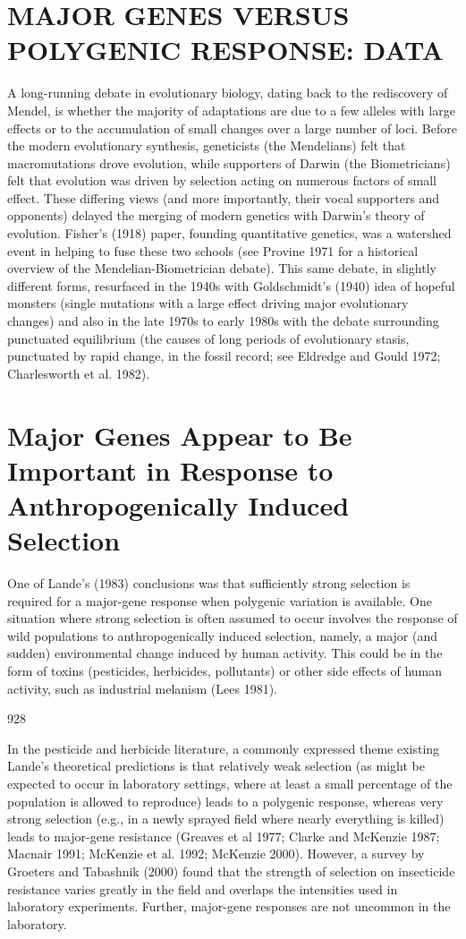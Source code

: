 \documentclass{article}
\begin{document}
\section{MAJOR GENES VERSUS POLYGENIC RESPONSE: DATA}
A long-running debate in evolutionary biology, dating back to the rediscovery of Mendel, is whether the majority of adaptations are due to a few alleles with large effects or to the accumulation of small changes over a large number of loci. Before the modern evolutionary synthesis, geneticists (the Mendelians) felt that macromutations drove evolution, while supporters of Darwin (the Biometricians) felt that evolution was driven by selection acting on numerous factors of small effect. These differing views (and more importantly, their vocal supporters and opponents) delayed the merging of modern genetics with Darwin's theory of evolution. Fisher's (1918) paper, founding quantitative genetics, was a watershed event in helping to fuse these two schools (see Provine 1971 for a historical overview of the Mendelian-Biometrician debate). This same debate, in slightly different forms, resurfaced in the 1940s with Goldschmidt's (1940) idea of hopeful monsters (single mutations with a large effect driving major evolutionary changes) and also in the late 1970s to early 1980s with the debate surrounding punctuated equilibrium (the causes of long periods of evolutionary stasis, punctuated by rapid change, in the fossil record; see Eldredge and Gould 1972; Charlesworth et al. 1982).

\section{Major Genes Appear to Be Important in Response to Anthropogenically Induced Selection}
One of Lande's (1983) conclusions was that sufficiently strong selection is required for a major-gene response when polygenic variation is available. One situation where strong selection is often assumed to occur involves the response of wild populations to anthropogenically induced selection, namely, a major (and sudden) environmental change induced by human activity. This could be in the form of toxins (pesticides, herbicides, pollutants) or other side effects of human activity, such as industrial melanism (Lees 1981).

928

In the pesticide and herbicide literature, a commonly expressed theme existing Lande's theoretical predictions is that relatively weak selection (as might be expected to occur in laboratory settings, where at least a small percentage of the population is allowed to reproduce) leads to a polygenic response, whereas very strong selection (e.g., in a newly sprayed field where nearly everything is killed) leads to major-gene resistance (Greaves et al 1977; Clarke and McKenzie 1987; Macnair 1991; McKenzie et al. 1992; McKenzie 2000). However, a survey by Groeters and Tabashnik (2000) found that the strength of selection on insecticide resistance varies greatly in the field and overlaps the intensities used in laboratory experiments. Further, major-gene responses are not uncommon in the laboratory.
\end{document}
